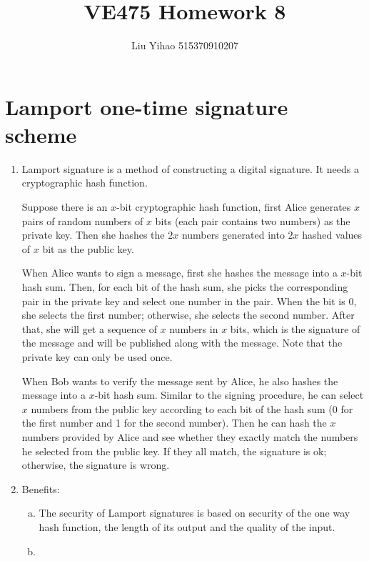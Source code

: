 \documentclass{article}
\title{VE475 Homework 8}
\author{Liu Yihao 515370910207}
\date{}
\begin{document}
\maketitle

\section{Lamport one-time signature scheme}
\begin{enumerate}
\item
Lamport signature is a method of constructing a digital signature. It needs a cryptographic hash function.

Suppose there is an $x$-bit cryptographic hash function, first Alice generates $x$ pairs of random numbers of $x$ bits (each pair contains two numbers) as the private key. Then she hashes the $2x$ numbers generated into $2x$ hashed values of $x$ bit as the public key.

When Alice wants to sign a message, first she hashes the message into a $x$-bit hash sum. Then, for each bit of the hash sum, she picks the corresponding pair in the private key and select one number in the pair. When the bit is 0, she selects the first number; otherwise, she selects the second number. After that, she will get a sequence of $x$ numbers in $x$ bits, which is the signature of the message and will be published along with the message. Note that the private key can only be used once.

When Bob wants to verify the message sent by Alice, he also hashes the message into a $x$-bit hash sum. Similar to the signing procedure, he can select $x$ numbers from the public key according to each bit of the hash sum (0 for the first number and 1 for the second number). Then he can hash the $x$ numbers provided by Alice and see whether they exactly match the numbers he selected from the public key. If they all match, the signature is ok; otherwise, the signature is wrong.

\item
Benefits:
\begin{enumerate}[(a)]
\item The security of Lamport signatures is based on security of the one way hash function, the length of its output and the quality of the input.


\item 
\end{enumerate}

\end{enumerate}
\end{document}
